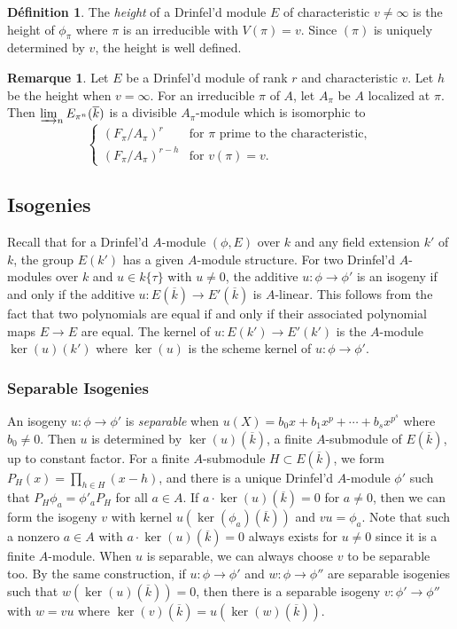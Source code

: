 \documentclass[12pt,a4paper]{article}
\theoremstyle{plain}
\theoremstyle{definition}
\newtheorem{definition}{D\'efinition}[section]
\newtheorem{remark}{Remarque}[section]
\theoremstyle{remark}
\begin{document}
\begin{definition}
\label{def:height}
The \emph{height} of a Drinfel'd module $E$ of characteristic $v \neq \infty$ is the height of $\phi_\pi$ where $\pi$ is an irreducible with $V(\pi) = v$. Since $(\pi)$ is uniquely determined by $v$, the height is well defined.
\end{definition}

\begin{remark}
\label{rem:tate}
Let $E$ be a Drinfel'd module of rank $r$ and characteristic $v$. Let $h$ be the height when $v = \infty$. For an irreducible $\pi$ of $A$, let $A_\pi$ be $A$ localized at $\pi$. Then $\varinjlim_n E_{\pi^n}(\overline{k})$ is a divisible $A_\pi$-module which is isomorphic to
\[
\begin{cases} (F_\pi/A_\pi)^r & \text{for } \pi \text{ prime to the characteristic}, \\ (F_\pi/A_\pi)^{r-h} & \text{for } v(\pi) = v. \end{cases}
\]
\end{remark}

\subsection{Isogenies}
\label{sec:isogenies}

Recall that for a Drinfel'd $A$-module $(\phi, E)$ over $k$ and any field extension $k'$ of $k$, the group $E(k')$ has a given $A$-module structure. For two Drinfel'd $A$-modules over $k$ and $u \in k\{\tau\}$ with $u \neq 0$, the additive $u: \phi \to \phi'$ is an isogeny if and only if the additive $u: E(\overline{k}) \to E'(\overline{k})$ is $A$-linear. This follows from the fact that two polynomials are equal if and only if their associated polynomial maps $E \to E$ are equal. The kernel of $u: E(k') \to E'(k')$ is the $A$-module $\ker(u)(k')$ where $\ker(u)$ is the scheme kernel of $u: \phi \to \phi'$.

\subsubsection*{Separable Isogenies}

An isogeny $u: \phi \to \phi'$ is \emph{separable} when $u(X) = b_0 x + b_1 x^p + \cdots + b_s x^{p^s}$ where $b_0 \neq 0$. Then $u$ is determined by $\ker(u)(\overline{k})$, a finite $A$-submodule of $E(\overline{k})$, up to constant factor. For a finite $A$-submodule $H \subset E(\overline{k})$, we form $P_H(x) = \prod_{h \in H} (x - h)$, and there is a unique Drinfel'd $A$-module $\phi'$ such that $P_H \phi_a = \phi'_a P_H$ for all $a \in A$. If $a \cdot \ker(u)(\overline{k}) = 0$ for $a \neq 0$, then we can form the isogeny $v$ with kernel $u(\ker(\phi_a)(\overline{k}))$ and $vu = \phi_a$. Note that such a nonzero $a \in A$ with $a \cdot \ker(u)(\overline{k}) = 0$ always exists for $u \neq 0$ since it is a finite $A$-module. When $u$ is separable, we can always choose $v$ to be separable too. By the same construction, if $u: \phi \to \phi'$ and $w: \phi \to \phi''$ are separable isogenies such that $w(\ker(u)(\overline{k})) = 0$, then there is a separable isogeny $v: \phi' \to \phi''$ with $w = vu$ where $\ker(v)(\overline{k}) = u(\ker(w)(\overline{k}))$.
\end{document}
